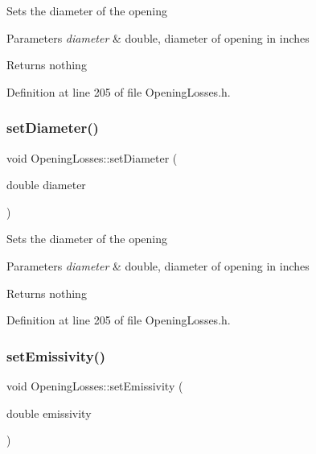 Sets the diameter of the opening


\begin{DoxyParams}{Parameters}
{\em diameter} & double, diameter of opening in inches\\
\hline
\end{DoxyParams}
\begin{DoxyReturn}{Returns}
nothing 
\end{DoxyReturn}


Definition at line 205 of file Opening\+Losses.\+h.

\mbox{\label{class_opening_losses_ab840ba51788e83c0b1dc9b8c05b1eadb}} 
\subsubsection{\texorpdfstring{set\+Diameter()}{setDiameter()}\hspace{0.1cm}{\footnotesize\ttfamily [3/3]}}
{\footnotesize\ttfamily void Opening\+Losses\+::set\+Diameter (\begin{DoxyParamCaption}\item[{double}]{diameter }\end{DoxyParamCaption})\hspace{0.3cm}{\ttfamily [inline]}}

Sets the diameter of the opening


\begin{DoxyParams}{Parameters}
{\em diameter} & double, diameter of opening in inches\\
\hline
\end{DoxyParams}
\begin{DoxyReturn}{Returns}
nothing 
\end{DoxyReturn}


Definition at line 205 of file Opening\+Losses.\+h.

\mbox{\label{class_opening_losses_aa63eb1c2ba9057d401f3a7f5dd974afe}} 
\subsubsection{\texorpdfstring{set\+Emissivity()}{setEmissivity()}\hspace{0.1cm}{\footnotesize\ttfamily [1/3]}}
{\footnotesize\ttfamily void Opening\+Losses\+::set\+Emissivity (\begin{DoxyParamCaption}\item[{double}]{emissivity }\end{DoxyParamCaption})\hspace{0.3cm}{\ttfamily [inline]}}


